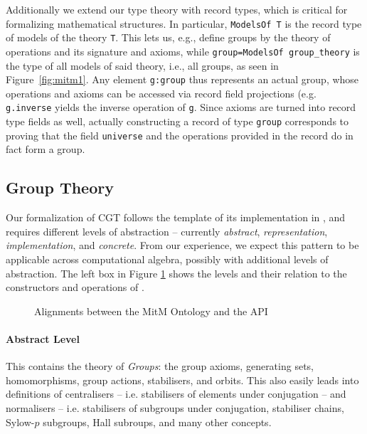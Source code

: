 Additionally we extend our type theory with record types, which is critical for formalizing mathematical structures.
In particular, \lstinline|ModelsOf T| is the record type of models of the theory \lstinline|T|.
This lets us, e.g., define groups by the theory of operations and its signature and axioms, while \lstinline|group=ModelsOf group_theory| is the type of all models of said theory, i.e., all groups, as seen in Figure~\ref{fig:mitm1}.
Any element \lstinline|g:group| thus represents an actual group, whose operations and axioms can be accessed via record field projections (e.g. \lstinline|g.inverse| yields the inverse operation of \lstinline|g|.
Since axioms are turned into record type fields as well, actually constructing a record of type \lstinline|group| corresponds to proving that the field \lstinline|universe| and the operations provided in the record do in fact form a group.

\subsection{Group Theory}

Our formalization of CGT follows the template of its implementation in \GAP, and requires different levels of abstraction -- currently \emph{abstract}, \emph{representation}, \emph{implementation}, and \emph{concrete}. From our experience, we expect this pattern to be applicable across computational algebra, possibly with additional levels of abstraction. 
The left box in Figure \ref{fig:cgtontology} shows the levels and their relation to the constructors and operations of \GAP.

\begin{figure}[ht]\centering\vspace*{-1em}
  \caption{Alignments between the MitM Ontology and the \GAP API}\label{fig:cgtontology}\vspace*{-1em}
\end{figure}

\paragraph{Abstract Level} This contains the theory of \emph{Groups}: the group
axioms, generating sets, homomorphisms, group actions, stabilisers, and orbits.
This also easily leads into definitions of centralisers -- i.e. stabilisers of
elements under conjugation -- and normalisers -- i.e. stabilisers of subgroups
under conjugation, stabiliser chains, Sylow-$p$ subgroups, Hall subroups, and
many other concepts.

